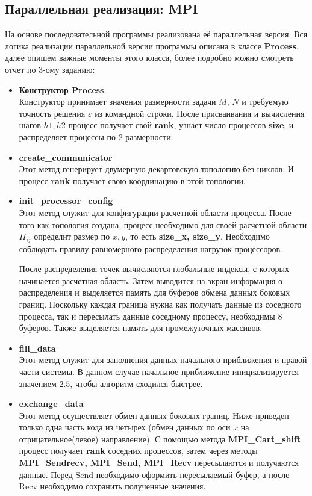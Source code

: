 \documentclass{article}
\begin{document}
\subsection{Параллельная реализация: MPI}
На основе последовательной программы реализована её параллельная версия. Вся логика реализации параллельной версии программы описана в классе \textbf{Process}, далее опишем важные моменты этого класса, более подробно можно смотреть отчет по 3-ому заданию: 
\begin{itemize}
    \item \textbf{Конструктор Process}\\
    Конструктор принимает значения размерности задачи $M$, $N$ и требуемую точность решения $\varepsilon$ из командной строки. После присваивания и вычисления шагов $h1, h2$ процесс получает свой \textbf{rank}, узнает число процессов \textbf{size}, и распределяет процессы по 2 размерности.  
    
    \item \textbf{create\_communicator}\\
    Этот метод генерирует двумерную декартовскую топологию без циклов. И процесс \textbf{rank} получает свою координацию в этой топологии.
    
    \item \textbf{init\_processor\_config}\\
    Этот метод служит для конфигурации расчетной области процесса. После того как топология создана, процесс необходимо для своей расчетной области $\Pi_{ij}$ определит размер по $x, y$, то есть \textbf{size\_x, size\_y}. Необходимо соблюдать правилу равномерного распределения нагрузок процессоров.
    
    После распределения точек вычисляются глобальные индексы, с которых начинается расчетная область. Затем выводится на экран информация о распределения и выделяется память для буферов обмена данных боковых границ. Поскольку каждая граница нужна как получать данные из соседного процесса, так и пересылать данные соседному процессу, необходимы 8 буферов. Также выделяется память для промежуточных массивов.
    
    \item \textbf{fill\_data}\\
    Этот метод служит для заполнения данных начального приближения и правой части системы. В данном случае начальное приближение инициализируется значением $2.5$, чтобы алгоритм сходился быстрее. 
 
    \item \textbf{exchange\_data}\\
    Этот метод осуществляет обмен данных боковых границ. Ниже приведен только одна часть кода из четырех (обмен данных по оси $x$ на отрицательное(левое) направление). С помощью метода \textbf{MPI\_Cart\_shift} процесс получает \textbf{rank} соседних процессов, затем через методы \textbf{MPI\_Sendrecv, MPI\_Send, MPI\_Recv} пересылаются и получаются данные. Перед Send необходимо оформить пересылаемый буфер, а после Recv необходимо сохранить полученные значения. 
    

\end{itemize}
\end{document}
